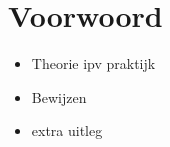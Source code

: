 \documentclass[computergesteund_ontwerp_van_curven_en_oppervlakken.tex]{subfiles}
\begin{document}
\section*{Voorwoord}
\begin{itemize}
\item Theorie ipv praktijk
\item Bewijzen
\item extra uitleg
\end{itemize}
\end{document}
